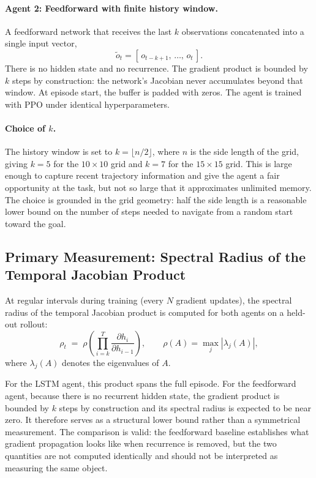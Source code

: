 \documentclass[11pt,a4paper]{article}
\begin{document}
\paragraph{Agent 2: Feedforward with finite history window.}
A feedforward network that receives the last $k$ observations concatenated into a single input vector,
\begin{equation}
  \tilde{o}_t = \left[\, o_{t-k+1},\, \ldots,\, o_t \,\right].
\end{equation}
There is no hidden state and no recurrence. The gradient product is bounded by $k$ steps by construction: the network's Jacobian never accumulates beyond that window. At episode start, the buffer is padded with zeros. The agent is trained with PPO under identical hyperparameters.

\paragraph{Choice of $k$.}
The history window is set to $k = \lfloor n/2 \rfloor$, where $n$ is the side length of the grid, giving $k = 5$ for the $10 \times 10$ grid and $k = 7$ for the $15 \times 15$ grid. This is large enough to capture recent trajectory information and give the agent a fair opportunity at the task, but not so large that it approximates unlimited memory. The choice is grounded in the grid geometry: half the side length is a reasonable lower bound on the number of steps needed to navigate from a random start toward the goal.

\subsection{Primary Measurement: Spectral Radius of the Temporal Jacobian Product}

At regular intervals during training (every $N$ gradient updates), the spectral radius of the temporal Jacobian product is computed for both agents on a held-out rollout:
\begin{equation}
  \rho_t \;=\; \rho\!\left(\prod_{i=k}^{T} \frac{\partial h_i}{\partial h_{i-1}}\right),
  \qquad
  \rho(A) = \max_j \left|\lambda_j(A)\right|,
\end{equation}
where $\lambda_j(A)$ denotes the eigenvalues of $A$.

For the LSTM agent, this product spans the full episode. For the feedforward agent, because there is no recurrent hidden state, the gradient product is bounded by $k$ steps by construction and its spectral radius is expected to be near zero. It therefore serves as a structural lower bound rather than a symmetrical measurement. The comparison is valid: the feedforward baseline establishes what gradient propagation looks like when recurrence is removed, but the two quantities are not computed identically and should not be interpreted as measuring the same object.
\end{document}
